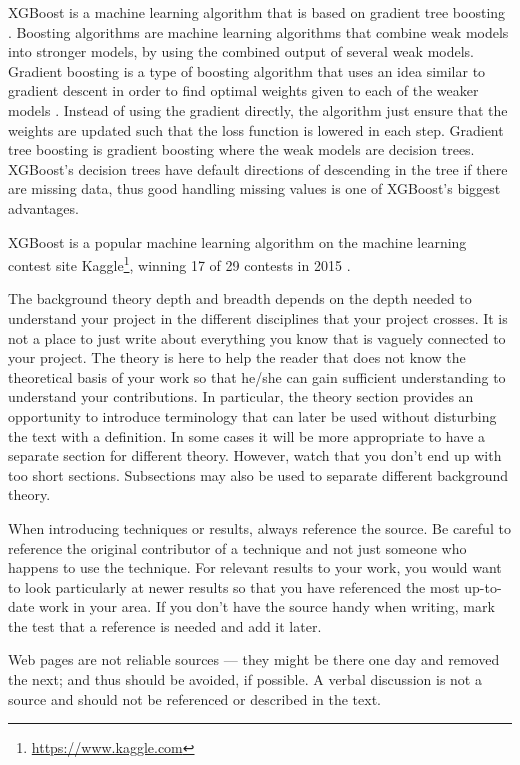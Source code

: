 XGBoost is a machine learning algorithm that is based on gradient tree boosting \citep{xgboost}. Boosting algorithms are machine learning algorithms that combine weak models into stronger models, by using the combined output of several weak models. Gradient boosting is a type of boosting algorithm that uses an idea similar to gradient descent in order to find optimal weights given to each of the weaker models \citep{gradientboosting}. Instead of using the gradient directly, the algorithm just ensure that the weights are updated such that the loss function is lowered in each step. Gradient tree boosting is gradient boosting where the weak models are decision trees. XGBoost's decision trees have default directions of descending in the tree if there are missing data, thus good handling missing values is one of XGBoost's biggest advantages.

XGBoost is a popular machine learning algorithm on the machine learning contest site Kaggle\footnote{\url{https://www.kaggle.com}}, winning 17 of 29 contests in 2015 \citep{xgboost}.

\iffalse
The background theory depth and breadth depends on the depth needed to understand your project in the different disciplines that your project crosses.  It is not a place to just write about everything you know that is vaguely connected to your project. The theory is here to help the reader that does not know the theoretical basis of your work so that he/she can gain sufficient understanding to understand your contributions. In particular, the theory section provides an opportunity to introduce terminology that can later be used without disturbing the text with a definition.  In some cases it will be more appropriate to have a separate section for different theory. However, watch that you don't end up with too short sections. Subsections may also be used to separate different background theory. 

When introducing techniques or results, always reference the source. Be careful to reference the original contributor of a technique and not just someone who happens to use the technique. For relevant results to your work, you would want to look particularly at newer results so that you have referenced the most up-to-date work in your area. If you don't have the source handy when writing, mark the test that a reference is needed and add it later. 

Web pages are not reliable sources --- they might be there one day and removed the next; and thus should be avoided, if possible. A verbal discussion is not a source and should not be referenced or described in the text.  

